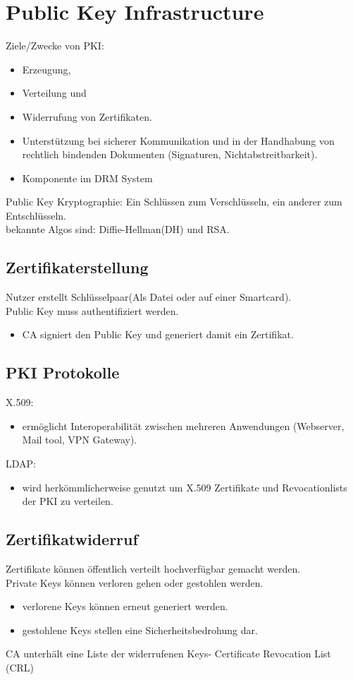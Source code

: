 \documentclass{article} %
\begin{document}
\section{Public Key Infrastructure}
Ziele/Zwecke von PKI:
\begin{itemize}
	\item Erzeugung,
    \item Verteilung und
    \item Widerrufung von Zertifikaten.\\
    \item Unterstützung bei sicherer Kommunikation und in der Handhabung von rechtlich bindenden Dokumenten (Signaturen, Nichtabstreitbarkeit).
    \item Komponente im DRM System
\end{itemize}
Public Key Kryptographie: Ein Schlüssen zum Verschlüsseln, ein anderer zum Entschlüsseln.\\
bekannte Algos sind: Diffie-Hellman(DH) und RSA.\\
\subsection{Zertifikaterstellung}
Nutzer erstellt Schlüsselpaar(Als Datei oder auf einer Smartcard).\\
Public Key muss authentifiziert werden.
\begin{itemize}
	\item CA signiert den Public Key und generiert damit ein Zertifikat.
\end{itemize}
\subsection{PKI Protokolle}
X.509:
\begin{itemize}
	\item ermöglicht Interoperabilität zwischen mehreren Anwendungen (Webserver, Mail tool, VPN Gateway).
\end{itemize}
LDAP:
\begin{itemize}
	\item wird herkömmlicherweise genutzt um X.509 Zertifikate und Revocationlists der PKI zu verteilen. 
\end{itemize}
\subsection{Zertifikatwiderruf}
Zertifikate können öffentlich verteilt hochverfügbar gemacht werden.\\
Private Keys können verloren gehen oder gestohlen werden.\\
\begin{itemize}
	\item verlorene Keys können erneut generiert werden.
    \item gestohlene Keys stellen eine Sicherheitsbedrohung dar.
\end{itemize}
CA unterhält eine Liste der widerrufenen Keys- Certificate Revocation List (CRL)
\end{document}
